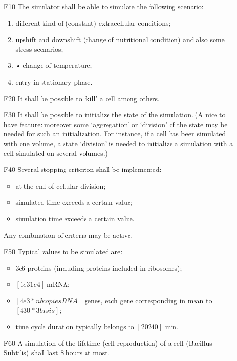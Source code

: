 
\begin{enumerate}
  \item[F10] The simulator shall be able to simulate the following scenario:
  \begin{enumerate}
    \item different kind of (constant) extracellular conditions;
    \item upshift and downshift (change of nutritional condition) and also some stress scenarios;
    \item •	change of temperature;
    \item entry in stationary phase.
  \end{enumerate}
  \item[F20] It shall be possible to ‘kill’ a cell among others.
  \item[F30] It shall be possible to initialize the state of the simulation. (A nice to have feature: moreover some ‘aggregation’ or ‘division’ of the state may be needed for such an initialization. For instance, if a cell has been simulated with one volume, a state ‘division’ is needed to initialize a simulation with a cell simulated on several volumes.)
  \item[F40] Several stopping criterion shall be implemented:
  \begin{itemize}
    \item at the end of cellular division;
    \item simulated time exceeds a certain value;
    \item simulation time exceeds a certain value.
  \end{itemize}
      Any combination of criteria may be active.
  \item[F50] Typical values to be simulated are:
  \begin{itemize}
    \item 3e6 proteins (including proteins included in ribosomes);
    \item $[1e3 1e4]$ mRNA;
    \item $[4e3 *nb copies DNA]$  genes, each gene corresponding in mean  to  $[430 *3  basis]$;
    \item time cycle duration typically belongs to  $[20 240]$ min.
  \end{itemize}
  \item[F60] A simulation of the lifetime (cell reproduction) of a cell (Bacillus Subtilis) shall last 8 hours at most.
  \\


\end{enumerate}
